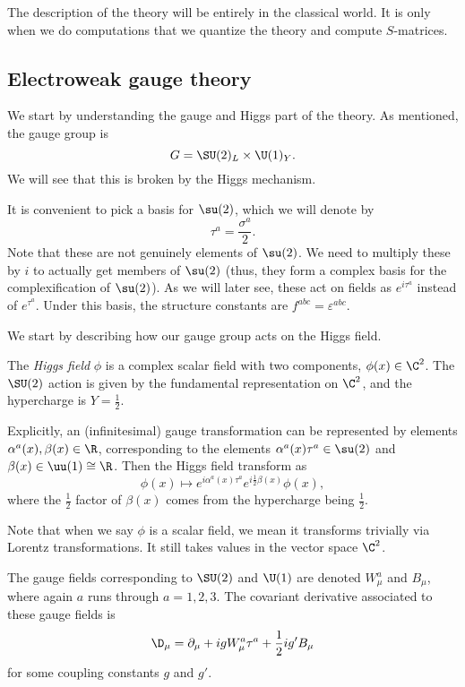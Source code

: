 \documentclass[a4paper]{article}
\begin{document}
The description of the theory will be entirely in the classical world. It is only when we do computations that we quantize the theory and compute $S$-matrices.

\subsection{Electroweak gauge theory}
We start by understanding the gauge and Higgs part of the theory. As mentioned, the gauge group is
\[
  G = \SU(2)_L \times \U(1)_Y.
\]
We will see that this is broken by the Higgs mechanism.

It is convenient to pick a basis for $\su(2)$, which we will denote by
\[
  \tau^a = \frac{\sigma^a}{2}.
\]
Note that these are not genuinely elements of $\su(2)$. We need to multiply these by $i$ to actually get members of $\su(2)$ (thus, they form a complex basis for the complexification of $\su(2)$). As we will later see, these act on fields as $e^{i \tau^a}$ instead of $e^{\tau^a}$. Under this basis, the structure constants are $f^{abc} = \varepsilon^{abc}$.

We start by describing how our gauge group acts on the Higgs field.
\begin{defi}
  The \emph{Higgs field} $\phi$ is a complex scalar field with two components, $\phi(x) \in \C^2$. The $\SU(2)$ action is given by the fundamental representation on $\C^2$, and the hypercharge is $Y = \frac{1}{2}$.

  Explicitly, an (infinitesimal) gauge transformation can be represented by elements $\alpha^a(x), \beta(x) \in \R$, corresponding to the elements $\alpha^a(x) \tau^a \in \su(2)$ and $\beta(x) \in \uu (1) \cong \R$. Then the Higgs field transform as
  \[
    \phi(x) \mapsto e^{i \alpha^a(x) \tau^a} e^{i \frac{1}{2} \beta(x)} \phi(x),
  \]
  where the $\frac{1}{2}$ factor of $\beta(x)$ comes from the hypercharge being $\frac{1}{2}$.
\end{defi}
Note that when we say $\phi$ is a scalar field, we mean it transforms trivially via Lorentz transformations. It still takes values in the vector space $\C^2$.

The gauge fields corresponding to $\SU(2)$ and $\U(1)$ are denoted $W_\mu^a$ and $B_\mu$, where again $a$ runs through $a = 1, 2, 3$. The covariant derivative associated to these gauge fields is
\[
  \D_\mu = \partial_\mu + i g W_\mu^a \tau^a + \frac{1}{2} i g' B_\mu
\]
for some coupling constants $g$ and $g'$.
\end{document}
